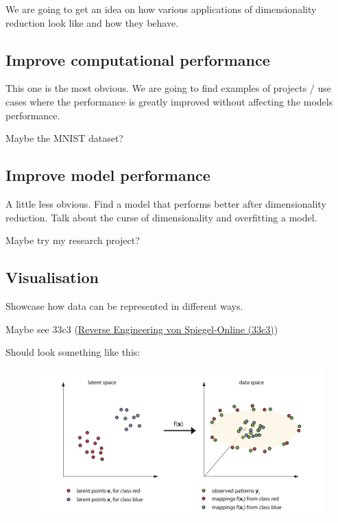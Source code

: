 We are going to get an idea on how various applications of dimensionality reduction look like and how they behave.

\subsection{Improve computational performance}

This one is the most obvious.
We are going to find examples of projects / use cases where the performance is greatly improved without affecting the models performance.

Maybe the MNIST dataset?

\clearpage





\subsection{Improve model performance}

A little less obvious.
Find a model that performs better after dimensionality reduction.
Talk about the curse of dimensionality and overfitting a model.

Maybe try my research project?

\clearpage





\subsection{Visualisation}

Showcase how data can be represented in different ways.

Maybe see 33c3 (\href{https://www.youtube.com/watch?v=-YpwsdRKt8Q}{Reverse Engineering von Spiegel-Online (33c3)})

Should look something like this:

\begin{figure}[h]
  \centering
  \includegraphics[width=0.9\linewidth]{external_content/graphs/latent_space_reduction_example.png}
  \captionsetup{justification=centering}
  \label{fig:visualisingReduction}
\end{figure}

\clearpage

